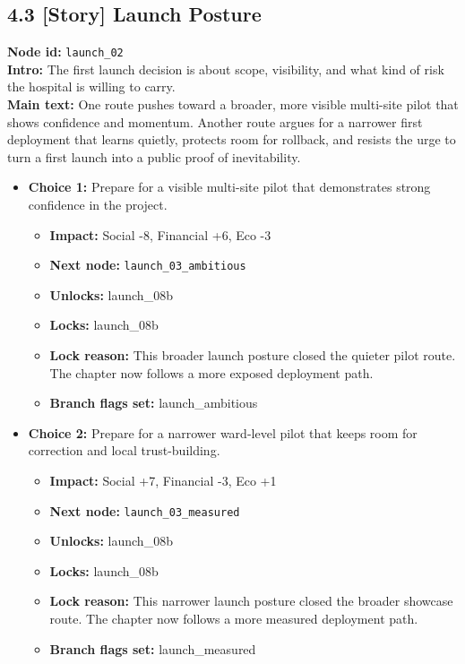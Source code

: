 \documentclass[11pt]{article}
\begin{document}
\subsection*{4.3 [Story] Launch Posture}
\textbf{Node id:} \texttt{launch\_02}\\
\textbf{Intro:} The first launch decision is about scope, visibility, and what kind of risk the hospital is willing to carry.\\
\textbf{Main text:} One route pushes toward a broader, more visible multi-site pilot that shows confidence and momentum. Another route argues for a narrower first deployment that learns quietly, protects room for rollback, and resists the urge to turn a first launch into a public proof of inevitability.\\
\begin{itemize}
\item \textbf{Choice 1:} Prepare for a visible multi-site pilot that demonstrates strong confidence in the project.
\begin{itemize}
\item \textbf{Impact:} Social -8, Financial +6, Eco -3
\item \textbf{Next node:} \texttt{launch\_03\_ambitious}
\item \textbf{Unlocks:} launch\_08b
\item \textbf{Locks:} launch\_08b
\item \textbf{Lock reason:} This broader launch posture closed the quieter pilot route. The chapter now follows a more exposed deployment path.
\item \textbf{Branch flags set:} launch\_ambitious
\end{itemize}
\item \textbf{Choice 2:} Prepare for a narrower ward-level pilot that keeps room for correction and local trust-building.
\begin{itemize}
\item \textbf{Impact:} Social +7, Financial -3, Eco +1
\item \textbf{Next node:} \texttt{launch\_03\_measured}
\item \textbf{Unlocks:} launch\_08b
\item \textbf{Locks:} launch\_08b
\item \textbf{Lock reason:} This narrower launch posture closed the broader showcase route. The chapter now follows a more measured deployment path.
\item \textbf{Branch flags set:} launch\_measured
\end{itemize}
\end{itemize}
\end{document}
